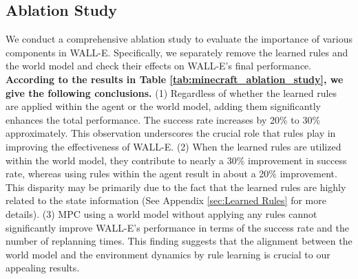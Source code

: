 \documentclass{article} %
\newcommand{\ours}{{\scshape WALL-E}\xspace}
\begin{document}
\subsection{Ablation Study}

We conduct a comprehensive ablation study to evaluate the importance of various components in \ours. Specifically, we separately remove the learned rules and the world model and check their effects on WALL-E's final performance. \textbf{According to the results in Table \ref{tab:minecraft_ablation_study}, we give the following conclusions.}
(1) Regardless of whether the learned rules are applied within the agent or the world model, adding them significantly enhances the total performance. The success rate increases by 20\% to 30\% approximately. This observation underscores the crucial role that rules play in improving the effectiveness of \ours.
(2) When the learned rules are utilized within the world model, they contribute to nearly a 30\% improvement in success rate, whereas using rules within the agent result in about a 20\% improvement. This disparity may be primarily due to the fact that the learned rules are highly related to the state information (See Appendix \ref{sec:Learned Rules} for more details). 
(3) MPC using a world model without applying any rules cannot significantly improve \ours's performance in terms of the success rate and the number of replanning times. This finding suggests that the alignment between the world model and the environment dynamics by rule learning is crucial to our appealing results.
\end{document}
